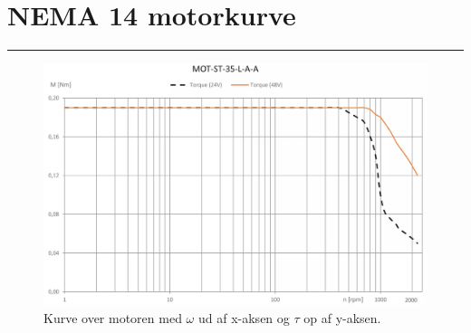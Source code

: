 \chapter{NEMA 14 motorkurve}
\label{bilag - NEMA 14 motorkurve}

\plainbreak{-1}
\begin{figure} [H]
    \centering
    \includegraphics[width=1.15\textwidth, angle=-90]{Sections/6 Detaljeløsning/Media/Billeder til indspænding/BilagMotorkurve.png}
    \caption{Kurve over motoren med \(\omega\) ud af x-aksen og \(\tau\) op af y-aksen.\parencite{Igus2025DrylinNEMA14}}
\end{figure}